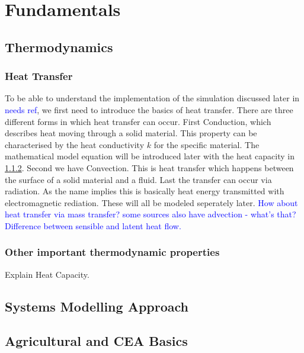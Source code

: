 \chapter{Fundamentals}
\label{chap:fundamentals}

\section{Thermodynamics}
\subsection{Heat Transfer}
To be able to understand the implementation of the simulation discussed later in \textcolor{blue}{needs ref}, we first need to introduce the basics of heat transfer. 
There are three different forms in which heat transfer can occur.
First Conduction, which describes heat moving through a solid material. This property can be characterised by the heat conductivity $k$ for the specific material.
The mathematical model equation will be introduced later with the heat capacity in \ref{sub:ther-props}.
Second we have Convection.
This is heat transfer which happens between the surface of a solid material and a fluid.
Last the transfer can occur via radiation.
As the name implies this is basically heat energy transmitted with electromagnetic rediation.
These will all be modeled seperately later.
\textcolor{blue}{How about heat transfer via mass transfer?}
\textcolor{blue}{some sources also have advection - what's that?}
\textcolor{blue}{Difference between sensible and latent heat flow.}

\subsection{Other important thermodynamic properties}
\label{sub:ther-props}
Explain Heat Capacity.



\section{Systems Modelling Approach}
\section{Agricultural and CEA Basics}
%
